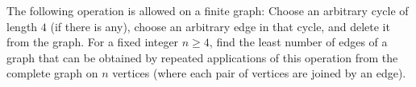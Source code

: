 The following operation is allowed on a finite graph: Choose an arbitrary cycle of length $4$ (if there is any), choose an arbitrary edge in that cycle, and delete it from the graph. For a fixed integer $n \geq 4$, find the least number of edges of a graph that can be obtained by repeated applications of this operation from the complete graph on $n$ vertices (where each pair of vertices are joined by an edge).
